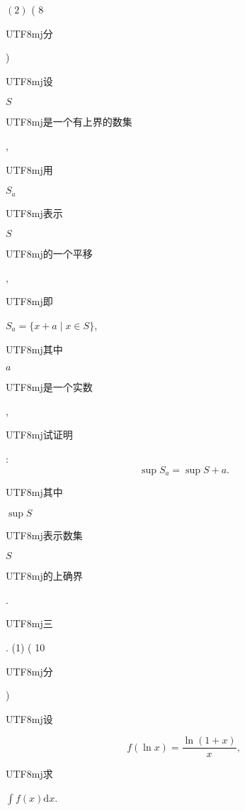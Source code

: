 \documentclass[10pt]{article}
\begin{document}
$(2)$ ( 8 \begin{CJK}{UTF8}{mj}分\end{CJK}) \begin{CJK}{UTF8}{mj}设\end{CJK} $S$ \begin{CJK}{UTF8}{mj}是一个有上界的数集\end{CJK}, \begin{CJK}{UTF8}{mj}用\end{CJK} $S_{a}$ \begin{CJK}{UTF8}{mj}表示\end{CJK} $S$ \begin{CJK}{UTF8}{mj}的一个平移\end{CJK}, \begin{CJK}{UTF8}{mj}即\end{CJK} $S_{a}=\{x+a \mid x \in S\}$, \begin{CJK}{UTF8}{mj}其中\end{CJK} $a$ \begin{CJK}{UTF8}{mj}是一个实数\end{CJK}, \begin{CJK}{UTF8}{mj}试证明\end{CJK}:
$$
\sup S_{a}=\sup S+a .
$$
\begin{CJK}{UTF8}{mj}其中\end{CJK} $\sup S$ \begin{CJK}{UTF8}{mj}表示数集\end{CJK} $S$ \begin{CJK}{UTF8}{mj}的上确界\end{CJK}.

\begin{CJK}{UTF8}{mj}三\end{CJK}. (1) ( 10 \begin{CJK}{UTF8}{mj}分\end{CJK}) \begin{CJK}{UTF8}{mj}设\end{CJK}
$$
f(\ln x)=\frac{\ln (1+x)}{x},
$$
\begin{CJK}{UTF8}{mj}求\end{CJK} $\int f(x) \mathrm{d} x$.
\end{document}
